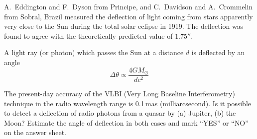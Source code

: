 A.~Eddington and F.~Dyson from Principe, and C.~Davidson and A.~Crommelin from
Sobral, Brazil measured the deflection of light coming from stars apparently
very close to the Sun during the total solar eclipse in 1919. The deflection
was found to agree with the theoretically predicted value of $1.75''$.

A light ray (or photon) which passes the Sun at a distance $d$ is deflected by
an angle
\[ \Delta\theta \propto \frac{4GM_\odot}{d c^2} \]

The present-day accuracy of the VLBI (Very Long Baseline Interferometry)
technique in the radio wavelength range is 0.1\,mas (milliarcsecond). Is it
possible to detect a deflection of radio photons from a quasar by (a) Jupiter,
(b) the Moon? Estimate the angle of deflection in both cases and mark ``YES''
or ``NO'' on the answer sheet.
